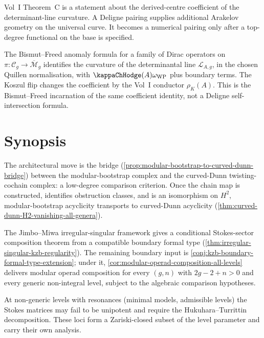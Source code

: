 \begin{remark}
\label{rem:chiral-deligne-lagrangian}
Vol~I Theorem~C is a statement about the derived-centre coefficient
of the determinant-line curvature. A Deligne pairing supplies
additional Arakelov geometry on the universal curve. It becomes a
numerical pairing only after a top-degree functional on the base is
specified.
\end{remark}

\begin{remark}
\label{rem:chiral-deligne-bismut-freed}
The Bismut--Freed anomaly formula for a family of Dirac
operators on \(\pi : \mathcal{C}_{g} \to
\overline{\mathcal{M}}_{g}\) identifies the curvature of the
determinantal line \(\mathscr L_{A,g}\), in the chosen Quillen
normalisation, with
\(\kappaChHodge(A)\omega_{\mathrm{WP}}\) plus boundary terms. The
Koszul flip changes the coefficient by the Vol~I conductor
\(\rho_K(A)\). This is the Bismut--Freed incarnation of the same
coefficient identity, not a Deligne self-intersection formula.
\end{remark}

\section*{Synopsis}

The architectural move is the bridge
(\autoref{prop:modular-bootstrap-to-curved-dunn-bridge}) between
the modular-bootstrap complex and the curved-Dunn twisting-cochain
complex: a low-degree comparison criterion. Once the chain map is
constructed, identifies obstruction classes, and is an isomorphism
on \(H^{2}\), modular-bootstrap acyclicity transports to
curved-Dunn acyclicity
(\autoref{thm:curved-dunn-H2-vanishing-all-genera}).

The Jimbo--Miwa irregular-singular framework gives a conditional
Stokes-sector composition theorem from a compatible boundary
formal type (\autoref{thm:irregular-singular-kzb-regularity}). The
remaining boundary input is
\autoref{conj:kzb-boundary-formal-type-extension}; under it,
\autoref{cor:modular-operad-composition-all-levels} delivers
modular operad composition for every \((g, n)\) with
\(2g - 2 + n > 0\) and every generic non-integral level, subject
to the algebraic comparison hypotheses.

At non-generic levels with resonances (minimal models, admissible
levels) the Stokes matrices may fail to be unipotent and require
the Hukuhara--Turrittin decomposition. These loci form a
Zariski-closed subset of the level parameter and carry their own
analysis.

